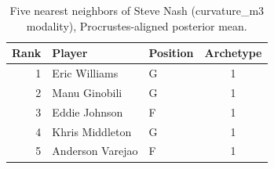 \begin{table}[htbp]
  \centering\small
  \begin{tabular}{rllc}
    \toprule
    Rank & Player & Position & Archetype \\
    \midrule
    1 & Eric Williams & G & 1 \\
    2 & Manu Ginobili & G & 1 \\
    3 & Eddie Johnson & F & 1 \\
    4 & Khris Middleton & G & 1 \\
    5 & Anderson Varejao & F & 1 \\
    \bottomrule
  \end{tabular}
  \caption{Five nearest neighbors of Steve Nash (curvature_m3 modality), Procrustes-aligned posterior mean.}
  \label{tab:Steve_Nash_neighbors_curvature_m3}
\end{table}

